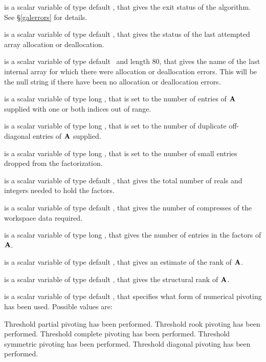 \documentclass{galahad}
\begin{document}
\begin{description}

 is a scalar variable of type default \integer, that gives the
exit status of the algorithm. 
See \S\ref{galerrors} 
for details.

 is a scalar variable of type default \integer, that gives
the status of the last attempted array allocation or deallocation.

 is a scalar variable of type default \character\
and length 80, that  gives the name of the last internal array 
for which there were allocation or deallocation errors.
This will be the null string if there have been no 
allocation or deallocation errors.


 is a scalar variable of type long \integer,
that is set to the number of 
entries of ${\mathbf{A}}$ supplied with one or both indices out of range.  

 is a scalar variable of type long \integer,
that is set to the number of duplicate off-diagonal entries of ${\mathbf{A}}$ supplied.

 is a scalar variable of type long \integer,
that is set to the number of small entries dropped from the factorization.

 is a scalar variable of type default \integer,
that gives the total number of reals and integers needed to hold the 
factors.

 is a scalar variable of type default \integer,
that gives the number of compresses of the workspace data required.

 is a scalar variable of type long \integer,
that gives the number of entries in the factors of ${\mathbf{A}}$.

 is a scalar variable of type default \integer,
that gives an estimate of the rank of ${\mathbf{A}}$.

 is a scalar variable of type default \integer,
that gives the structural rank of ${\mathbf{A}}$.

 is a scalar variable of type default \integer,
that specifies what form of numerical pivoting has been used.
Possible values are: 
\begin{description} 
   Threshold partial pivoting has been performed.
   Threshold rook pivoting has been performed.
   Threshold complete pivoting has been performed.
   Threshold symmetric pivoting has been performed.
   Threshold diagonal pivoting has been performed.
\end{description} 


\end{description}
\end{document}
